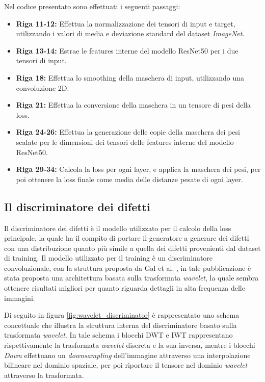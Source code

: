Nel codice presentato sono effettuati i seguenti passaggi:
\begin{itemize}
    \item \textbf{Riga 11-12:} Effettua la normalizzazione dei tensori di input e target, utilizzando i valori di media e deviazione standard del dataset \textit{ImageNet}.
    \item \textbf{Riga 13-14:} Estrae le features interne del modello ResNet50 per i due tensori di input.
    \item \textbf{Riga 18:} Effettua lo smoothing della maschera di input, utilizzando una convoluzione 2D.
    \item \textbf{Riga 21:} Effettua la conversione della maschera in un tensore di pesi della loss.
    \item \textbf{Riga 24-26:} Effettua la generazione delle copie della maschera dei pesi scalate per le dimensioni dei tensori delle features interne
        del modello ResNet50.
    \item \textbf{Riga 29-34:} Calcola la loss per ogni layer, e applica la maschera dei pesi, 
        per poi ottenere la loss finale come media delle distanze pesate di ogni layer.
\end{itemize}

\subsection{Il discriminatore dei difetti}
Il discriminatore dei difetti è il modello utilizzato per il calcolo della loss principale, la quale ha il compito di 
portare il generatore a generare dei difetti con una distribuzione quanto più simile a quella dei difetti provenienti dal dataset di training.
Il modello utilizzato per il training è un discriminatore convoluzionale, con la struttura proposta da Gal et al. \cite{gal2021swagan},
in tale pubblicazione è stata proposta una architettura basata sulla trasformata \textit{wavelet}, la quale sembra ottenere risultati
migliori per quanto riguarda dettagli in alta frequenza delle immagini.

Di seguito in figura \ref{fig:wavelet_discriminator} è rappresentato uno schema concettuale che illustra la struttura interna 
del discriminatore basato sulla trasformata \textit{wavelet}. In tale schema i blocchi DWT e IWT rappresentano rispettivamente
la trasformata \textit{wavelet} discreta e la sua inversa, mentre i blocchi \textit{Down} effettuano un \textit{downsampling} dell'immagine
attraverso una interpolazione bilineare nel dominio spaziale, per poi riportare il tensore nel dominio \textit{wavelet} attraverso la trasformata.

